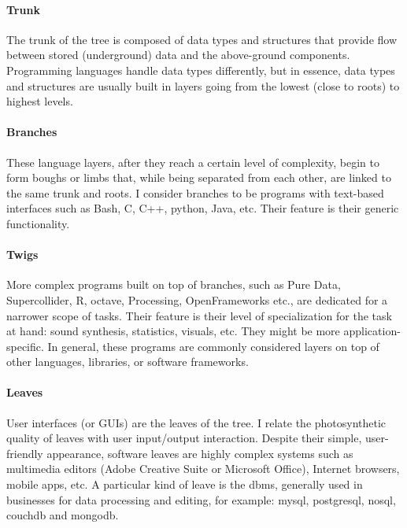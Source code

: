 \paragraph{Trunk}
The trunk of the tree is composed of data types and structures that provide flow between stored (underground) data and the above-ground components. Programming languages handle data types differently, but in essence, data types and structures are usually built in layers going from the lowest (close to roots) to highest levels.

\paragraph{Branches}
These language layers, after they reach a certain level of complexity, begin to form boughs or limbs that, while being separated from each other, are linked to the same trunk and roots. I consider branches to be programs with text-based interfaces such as Bash, C, C++, python, Java, etc. Their feature is their generic functionality.

\paragraph{Twigs}
More complex programs built on top of branches, such as Pure Data, Supercollider, R, octave, Processing, OpenFrameworks etc., are dedicated for a narrower scope of tasks. Their feature is their level of specialization for the task at hand: sound synthesis, statistics, visuals, etc. They might be more application-specific. In general, these programs are commonly considered layers on top of other languages, libraries, or software frameworks.

\paragraph{Leaves}
User interfaces (or GUIs) are the leaves of the tree. I relate the photosynthetic quality of leaves with user input/output interaction. Despite their simple, user-friendly appearance, software leaves are highly complex systems such as multimedia editors (Adobe Creative Suite or Microsoft Office), Internet browsers, mobile apps, etc. A particular kind of leave is the \gls{dbms}, generally used in businesses for data processing and editing, for example: \gls{mysql}, \gls{postgresql}, \gls{nosql}, \gls{couchdb} and \gls{mongodb}.

